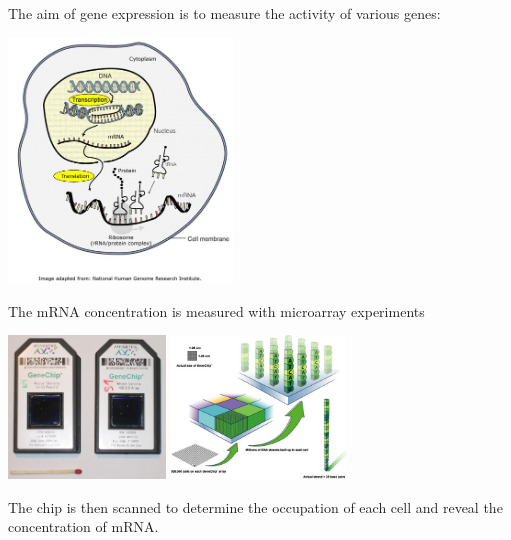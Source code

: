\documentclass{beamer}
\begin{document}
\begin{frame}{}
\vspace{0.75cm}
The aim of gene expression is to measure the activity of various genes:
\begin{center}
 \includegraphics[height=6.5cm]{figures/DNAtranscription} 
\end{center}
\end{frame}

\begin{frame}{}
\vspace{0.5cm}
The mRNA concentration is measured with microarray experiments\\
\vspace{0.25cm}
\begin{center}
 \includegraphics[height=3.8cm]{figures/Affymetrix} \qquad \qquad \includegraphics[height=3.8cm]{figures/microarray} 
\end{center}
\vspace{0.25cm}
The chip is then scanned to determine the occupation of each cell and reveal the concentration of mRNA. 
\end{frame}
\end{document}
